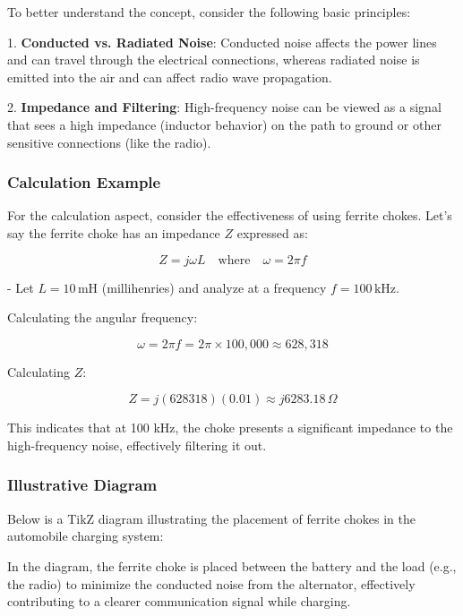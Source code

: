 To better understand the concept, consider the following basic principles:

1. \textbf{Conducted vs. Radiated Noise}: Conducted noise affects the power lines and can travel through the electrical connections, whereas radiated noise is emitted into the air and can affect radio wave propagation.
   
2. \textbf{Impedance and Filtering}: High-frequency noise can be viewed as a signal that sees a high impedance (inductor behavior) on the path to ground or other sensitive connections (like the radio).

\subsubsection{Calculation Example}

For the calculation aspect, consider the effectiveness of using ferrite chokes. Let's say the ferrite choke has an impedance \( Z \) expressed as:

\[
Z = j\omega L \quad \text{where} \quad \omega = 2\pi f
\]

- Let \( L = 10 \, \text{mH} \) (millihenries) and analyze at a frequency \( f = 100 \, \text{kHz} \).
  
Calculating the angular frequency:

\[
\omega = 2\pi f = 2\pi \times 100,000 \approx 628,318
\]

Calculating \( Z \):

\[
Z = j(628318)(0.01) \approx j6283.18 \, \Omega
\]

This indicates that at 100 kHz, the choke presents a significant impedance to the high-frequency noise, effectively filtering it out.

\subsubsection{Illustrative Diagram}

Below is a TikZ diagram illustrating the placement of ferrite chokes in the automobile charging system:

\begin{center}
\end{center}

In the diagram, the ferrite choke is placed between the battery and the load (e.g., the radio) to minimize the conducted noise from the alternator, effectively contributing to a clearer communication signal while charging.